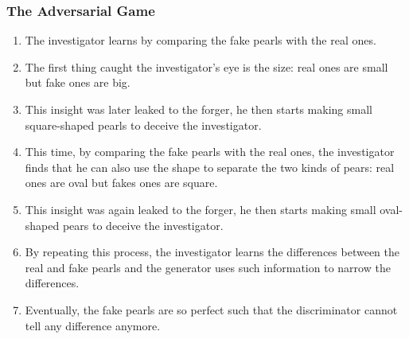 \documentclass{beamer}
\begin{document}
\begin{frame}
\setlength{\leftmargini}{0.3cm}
\setlength{\leftmarginii}{0.6cm}
\setlength{\leftmarginiii}{0.9cm}
\frametitle{The Adversarial Game}
\begin{enumerate}
\footnotesize
\item The investigator learns by comparing the fake pearls with the real ones.
\item The first thing caught the investigator's eye is the size: real ones are small but fake ones are big. 
\item This insight was later leaked to the forger, he then starts making small square-shaped pearls to deceive the investigator.
\item This time, by comparing the fake pearls with the real ones, the investigator finds that he can also use the shape to separate the two kinds of pears: real ones are oval but fakes ones are square.
\item This insight was again leaked to the forger, he then starts making small oval-shaped pears to deceive the investigator.
\item By repeating this process, the investigator learns the differences between the real and fake pearls and the generator uses such information to narrow the differences. 
\item Eventually, the fake pearls are so perfect such that the discriminator cannot tell any difference anymore.
\end{enumerate}
\end{frame}
\end{document}
